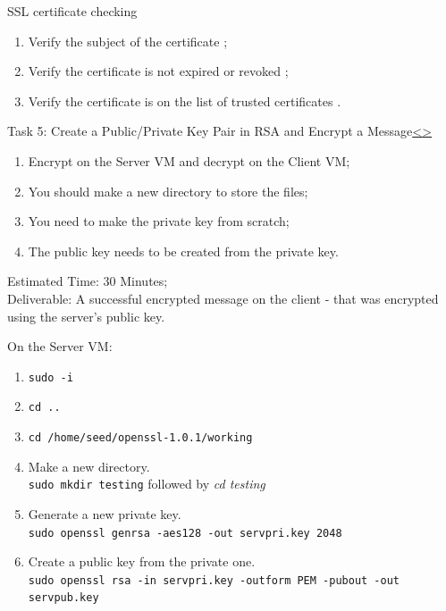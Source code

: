 \documentclass[12pt]{extarticle}
\newenvironment{instructionblock}{\Large\bgroup}{\egroup}
\newcommand{\ben}{\begin{enumerate}}
\newcommand{\een}{\end{enumerate}}
\begin{document}
\noindent
SSL certificate checking
\ben
	\item Verify the subject of the certificate \cite{digicert};
	\item Verify the certificate is not expired or revoked \cite{digicert};
	\item Verify the certificate is on the list of trusted certificates \cite{digicert}.
\een
	

\pagebreak
\begin{slide}{Task 5: Create a Public/Private Key Pair in RSA and Encrypt a Message}{\hyperref[slide 15]{\textless}\hyperref[slide 17]{\textgreater}}
	\begin{instructionblock}
		\ben
			\item Encrypt on the Server VM and decrypt on the Client VM;
			\item You should make a new directory to store the files;
			\item You need to make the private key from scratch;
			\item The public key needs to be created from the private key.
		\een
	\end{instructionblock}
\end{slide}
\noindent
Estimated Time: 30 Minutes; \\
Deliverable: A successful encrypted message on the client - that was encrypted using the server's public key.\\

\vspace*{2mm}

\noindent
On the Server VM:
\ben
	\item \texttt{sudo -i} 
	\item \texttt{cd ..} 
	\item \texttt{cd /home/seed/openssl-1.0.1/working}  
	\item Make a new directory.\\
	\texttt{sudo mkdir testing} followed by \textit{cd testing} 
	\item Generate a new private key.\\
	\texttt{sudo openssl genrsa -aes128 -out servpri.key 2048} 
	\item Create a public key from the private one.\\
	\texttt{sudo openssl rsa -in servpri.key -outform PEM -pubout -out servpub.key} 
\een
\end{document}
